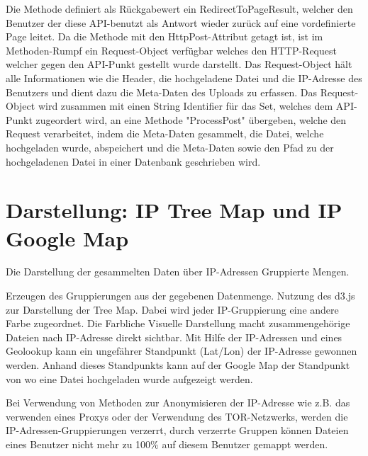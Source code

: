 \documentclass[
    fontsize=12pt,
    headings=small,
    parskip=half,           %
    bibliography=totoc,
    numbers=noenddot,       %
    open=any,               %
    ]{scrreprt}
\begin{document}

Die Methode definiert als Rückgabewert ein RedirectToPageResult, welcher den Benutzer der diese API-benutzt als Antwort wieder zurück auf eine vordefinierte Page leitet. 
Da die Methode mit den HttpPost-Attribut getagt ist, ist im Methoden-Rumpf ein Request-Object verfügbar welches den HTTP-Request welcher gegen den API-Punkt gestellt wurde darstellt. Das Request-Object hält alle Informationen wie die Header, die hochgeladene Datei und die IP-Adresse des Benutzers und dient dazu die Meta-Daten des Uploads zu erfassen. Das Request-Object wird zusammen mit einen String Identifier für das Set, welches dem API-Punkt zugeordert wird, an eine Methode "ProcessPost" übergeben, welche den Request verarbeitet, indem die Meta-Daten gesammelt, die Datei, welche hochgeladen wurde, abspeichert und die Meta-Daten sowie den Pfad zu der hochgeladenen Datei in einer Datenbank geschrieben wird.


\section{Darstellung: IP Tree Map und IP Google Map}

Die Darstellung der gesammelten Daten über IP-Adressen Gruppierte Mengen.

Erzeugen des Gruppierungen aus der gegebenen Datenmenge. Nutzung des d3.js zur Darstellung der Tree Map. Dabei wird jeder IP-Gruppierung eine andere Farbe zugeordnet. Die Farbliche Visuelle Darstellung macht zusammengehörige Dateien nach IP-Adresse direkt sichtbar. Mit Hilfe der IP-Adressen und eines Geolookup kann ein ungefährer Standpunkt (Lat/Lon) der IP-Adresse gewonnen werden. Anhand dieses Standpunkts kann auf der Google Map der Standpunkt von wo eine Datei hochgeladen wurde aufgezeigt werden. 

Bei Verwendung von Methoden zur Anonymisieren der IP-Adresse wie z.B. das verwenden eines Proxys oder der Verwendung des TOR-Netzwerks, werden die IP-Adressen-Gruppierungen verzerrt, durch verzerrte Gruppen können Dateien eines Benutzer nicht mehr zu 100\% auf diesem Benutzer gemappt werden.
\end{document}
